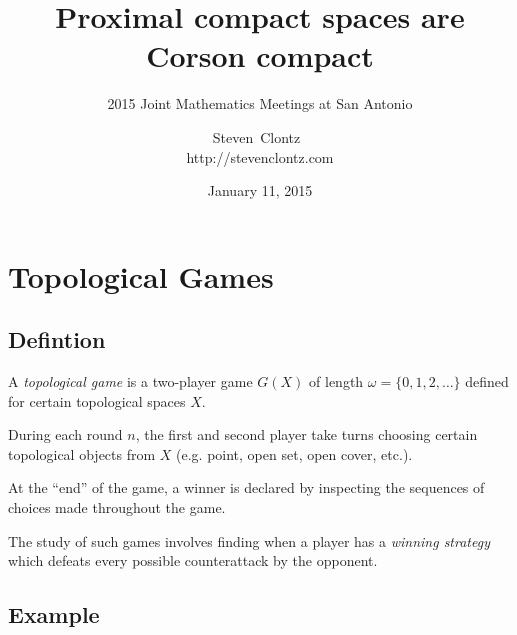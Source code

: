\documentclass{beamer}
\title
{Proximal compact spaces are Corson compact}
\subtitle
{2015 Joint Mathematics Meetings at San Antonio} %
\author%
{Steven~Clontz~\\http://stevenclontz.com}%
\institute[Auburn University] %
{
  Department of Mathematics and Statistics\\
  Auburn University}
\date[15-01-11] %
{January 11, 2015}
\theoremstyle{definition}
\newcommand{\<}{\langle}
\renewcommand{\>}{\rangle}
\newcommand{\term}{\textit}
\begin{document}
\renewcommand{\pause}{}
\newcommand{\vspacing}{\vspace{1em}}
\newcommand{\vpause}{\pause\vspacing}

\begin{frame}
  \titlepage
\end{frame}

\section{Topological Games}

\subsection{Defintion}

\begin{frame}
  A \term{topological game} is a two-player game $G(X)$ of length
  $\omega=\{0,1,2,\dots\}$ defined for certain topological spaces $X$.

  \vpause

  During each round $n$, the first and second player take turns choosing
  certain topological objects from $X$ (e.g. point, open set, open cover, etc.).

  \vpause

  At the ``end'' of the game, a winner is declared by inspecting the sequences
  of choices made throughout the game.

  \vpause

  The study of such games involves finding when a player has a
  \term{winning strategy} which defeats every possible counterattack by
  the opponent.
\end{frame}

\subsection{Example}
\end{document}
